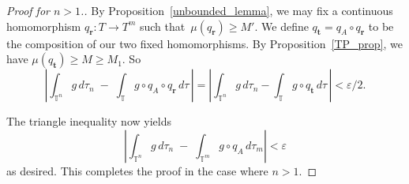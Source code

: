 \documentclass[12pt]{amsart}
\theoremstyle{plain}
\theoremstyle{definition}
\theoremstyle{remark}
\numberwithin{theorem}{section}
\numberwithin{equation}{section} %
\newcommand{\mb}{\mathbf}
\newcommand{\torus}{{\mathbb{T}}}
\begin{document}
\begin{proof}[Proof for $n>1$.]
By Proposition~\ref{unbounded_lemma}, we may fix a continuous homomorphism $q_\mb r \colon T\to T^m$ such that~$\mu\left( q_\mb r \right) \ge M'$. 
We define $q_{\mb t} = q_A \circ q_{\mb r}$ to be the composition of our two fixed homomorphisms.
By Proposition~\ref{TP_prop}, we have $\mu\left( q_{\mb t}\right) \ge M \ge M_1$. So
\[
\left|   \int_{\torus^{n}}  g   \, d \tau_{n}
 \; - \; 
\int_{\torus} g \circ q_A \circ q_{\mb r} \, d \tau \,
\right|
=
\left|   \int_{\torus^{n}} g \, d \tau_{n} - \int_{\torus} g \circ q_{\mb t} \, d \tau \,\right|
< \varepsilon/2.
\]

The triangle inequality now yields 
\[\left|  \int_{\torus^{n}}  g \, d \tau_{n} 
 \; - \; 
\int_{\torus^{m}} g \circ q_A \, d \tau_{m}
\right|
< \varepsilon\]
as desired.
This completes the proof in the case where $n > 1$.
\end{proof}

\end{document}
